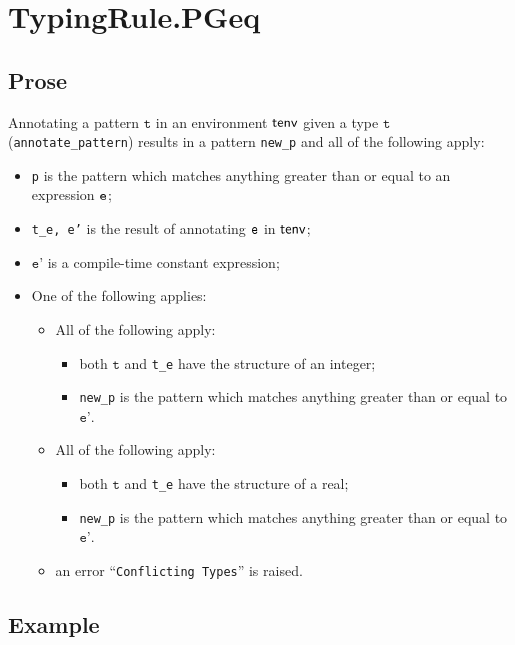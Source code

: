 \documentclass{book}
\newcommand\vt[0]{\texttt{t}}
\newcommand\vep[0]{\texttt{e'}}
\begin{document}
\section{TypingRule.PGeq \label{sec:TypingRule.PGeq}}

  \subsection{Prose}
   Annotating a pattern $\vt$ in an environment $\textsf{tenv}$ given a type $\vt$ (\texttt{annotate\_pattern}) results in a pattern \texttt{new\_p} and all of the following apply:
   \begin{itemize}
   \item \texttt{p} is the pattern which matches anything greater than or equal to an expression $\texttt{e}$;
   \item \texttt{t\_e, e'} is the result of annotating $\texttt{e}$ in $\textsf{tenv}$;
   \item $\vep$ is a compile-time constant expression;
   \item One of the following applies:
     \begin{itemize}
     \item All of the following apply:
           \begin{itemize}
           \item both $\vt$ and \texttt{t\_e} have the structure of an integer;
           \item \texttt{new\_p} is the pattern which matches anything greater than or equal to $\vep$.
           \end{itemize}
     \item All of the following apply:
           \begin{itemize}
           \item both $\vt$ and \texttt{t\_e} have the structure of a real;
           \item \texttt{new\_p} is the pattern which matches anything greater than or equal to $\vep$.
           \end{itemize}
     \item an error ``\texttt{Conflicting Types}'' is raised.
     \end{itemize}
   \end{itemize}

  \subsection{Example}


\end{document}
